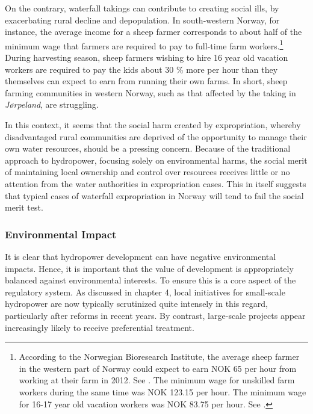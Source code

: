 On the contrary, waterfall takings can contribute to creating social ills, by exacerbating rural decline and depopulation. In south-western Norway, for instance, the average income for a sheep farmer corresponds to about half of the minimum wage that farmers are required to pay to full-time farm workers.\footnote{According to the Norwegian Bioresearch Institute, the average sheep farmer in the western part of Norway could expect to earn NOK 65 per hour from working at their farm in 2012. See \cite[50]{smesdal14}. The minimum wage for unskilled farm workers during the same time was NOK 123.15 per hour. The minimum wage for 16-17 year old vacation workers was NOK 83.75 per hour. See \cite{tariff12}.} During harvesting season, sheep farmers wishing to hire 16 year old vacation workers are required to pay the kids about 30 \% more per hour than they themselves can expect to earn from running their own farms. In short, sheep farming communities in western Norway, such as that affected by the taking in {\it Jørpeland}, are struggling.

In this context, it seems that the social harm created by expropriation, whereby disadvantaged rural communities are deprived of the opportunity to manage their own water resources, should be a pressing concern. Because of the traditional approach to hydropower, focusing solely on environmental harms, the social merit of maintaining local ownership and control over resources receives little or no attention from the water authorities in expropriation cases. This in itself suggests that typical cases of waterfall expropriation in Norway will tend to fail the social merit test.

\subsubsection{Environmental Impact}\label{sec:5:7:6}

It is clear that hydropower development can have negative environmental impacts. Hence, it is important that the value of development is appropriately balanced against environmental interests. To ensure this is a core aspect of the regulatory system. As discussed in chapter 4, local initiatives for small-scale hydropower are now typically scrutinized quite intensely in this regard, particularly after reforms in recent years. By contrast, large-scale projects appear increasingly likely to receive preferential treatment. %
 
